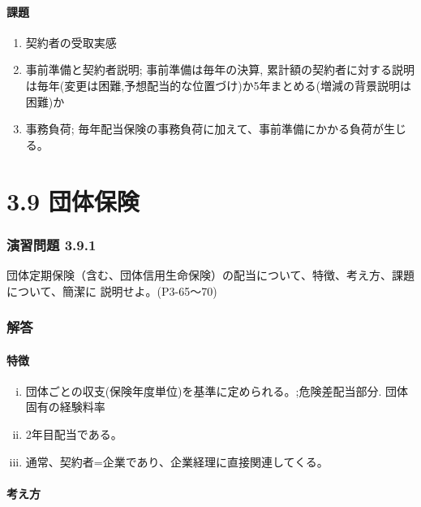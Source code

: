\documentclass[report,gutter=10mm,fore-edge=10mm,uplatex,dvipdfmx]{jlreq}
\begin{document}
\paragraph{課題}

\begin{enumerate} [(1)]
 \item 契約者の受取実感
 \item 事前準備と契約者説明; 事前準備は毎年の決算, 累計額の契約者に対する説明は毎年(変更は困難,予想配当的な位置づけ)か5年まとめる(増減の背景説明は困難)か
 \item 事務負荷; 毎年配当保険の事務負荷に加えて、事前準備にかかる負荷が生じる。
\end{enumerate}


\section{3.9 団体保険}
\subsubsection{演習問題 3.9.1}
団体定期保険（含む、団体信用生命保険）の配当について、特徴、考え方、課題について、簡潔に
説明せよ。(P3-65〜70)
\subsubsection{解答}
\paragraph{特徴}
\begin{enumerate} [(i)]
 \item 団体ごとの収支(保険年度単位)を基準に定められる。;危険差配当部分. 団体固有の経験料率
 \item 2年目配当である。
 \item 通常、契約者=企業であり、企業経理に直接関連してくる。
\end{enumerate}


\paragraph{考え方}
\end{document}
